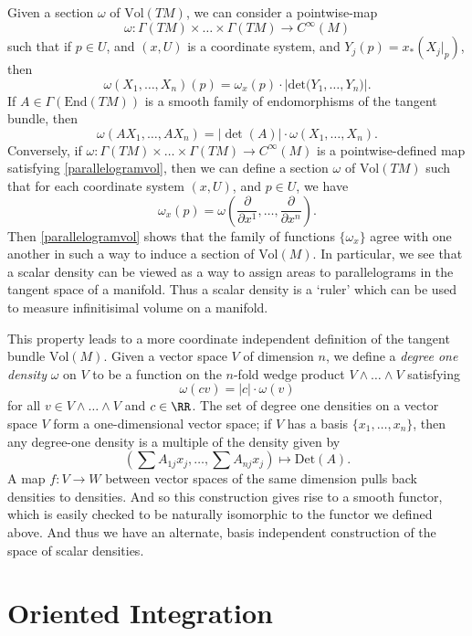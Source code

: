 Given a section $\omega$ of $\text{Vol}(TM)$, we can consider a pointwise-map
%
\[ \omega: \Gamma(TM) \times \dots \times \Gamma(TM) \to C^\infty(M) \]
%
such that if $p \in U$, and $(x,U)$ is a coordinate system, and $Y_j(p) = x_*(X_j|_p)$, then
%
\[ \omega(X_1, \dots, X_n)(p) = \omega_x(p) \cdot \big|\text{det} \big( Y_1, \dots, Y_n \big) \big|. \]
%
If $A \in \Gamma(\text{End}(TM))$ is a smooth family of endomorphisms of the tangent bundle, then
%
\begin{equation} \label{parallelogramvol} \omega(A X_1, \dots, A X_n) = |\det(A)| \cdot \omega(X_1, \dots, X_n). \end{equation}
%
Conversely, if $\omega: \Gamma(TM) \times \dots \times \Gamma(TM) \to C^\infty(M)$ is a pointwise-defined map satisfying \eqref{parallelogramvol}, then we can define a section $\omega$ of $\text{Vol}(TM)$ such that for each coordinate system $(x,U)$, and $p \in U$, we have
%
\[ \omega_x(p) = \omega \left( \frac{\partial}{\partial x^1}, \dots, \frac{\partial}{\partial x^n} \right). \]
%
Then \eqref{parallelogramvol} shows that the family of functions $\{ \omega_x \}$ agree with one another in such a way to induce a section of $\text{Vol}(M)$. In particular, we see that a scalar density can be viewed as a way to assign areas to parallelograms in the tangent space of a manifold. Thus a scalar density is a `ruler' which can be used to measure infinitisimal volume on a manifold.

This property leads to a more coordinate independent definition of the tangent bundle $\text{Vol}(M)$. Given a vector space $V$ of dimension $n$, we define a \emph{degree one density} $\omega$ on $V$ to be a function on the $n$-fold wedge product $V \wedge \dots \wedge V$ satisfying
%
\[ \omega(c v) = |c| \cdot \omega(v) \]
%
for all $v \in V \wedge \dots \wedge V$ and $c \in \RR$. The set of degree one densities on a vector space $V$ form a one-dimensional vector space; if $V$ has a basis $\{ x_1, \dots, x_n \}$, then any degree-one density is a multiple of the density given by
%
\[ (\sum A_{1j} x_j, \dots, \sum A_{nj} x_j) \mapsto \text{Det}(A). \]
%
A map $f: V \to W$ between vector spaces of the same dimension pulls back densities to densities. And so this construction gives rise to a smooth functor, which is easily checked to be naturally isomorphic to the functor we defined above. And thus we have an alternate, basis independent construction of the space of scalar densities.

\section{Oriented Integration}

